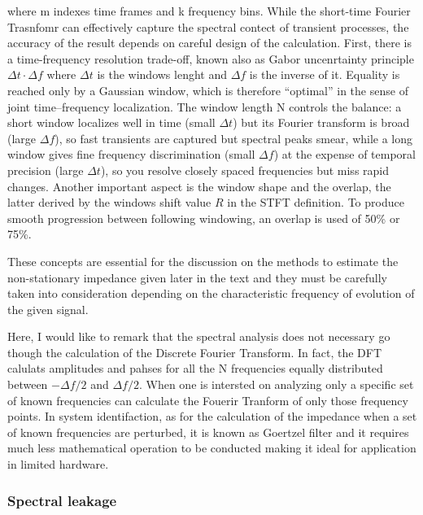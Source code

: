 where m indexes time frames and k frequency bins. While the short-time Fourier Trasnfomr can effectively capture the spectral contect of transient processes, the accuracy of the result depends on careful design of the calculation. First, there is a time-frequency resolution trade-off, known also as Gabor uncenrtainty principle $\Delta t \cdot \Delta f $ where $\Delta t$ is the windows lenght and $\Delta f$ is the inverse of it. Equality is reached only by a Gaussian window, which is therefore “optimal” in the sense of joint time–frequency localization. The window length N controls the balance: a short window localizes well in time (small $\Delta t$) but its Fourier transform is broad (large $\Delta f$), so fast transients are captured but spectral peaks smear, while a long window gives fine frequency discrimination (small $\Delta f$) at the expense of temporal precision (large $\Delta t$), so you resolve closely spaced frequencies but miss rapid changes. Another important aspect is the window shape and the overlap, the latter derived by the windows shift value $R$ in the STFT definition.  To produce smooth progression between following windowing, an overlap is used of 50\% or 75\%. 

These concepts are essential for the discussion on the methods to estimate the non-stationary impedance given later in the text and they must be carefully taken into consideration depending on the characteristic frequency of evolution of the given signal.

Here, I would like to remark that the spectral analysis does not necessary go though the calculation of the Discrete Fourier Transform. In fact, the DFT calulats amplitudes and pahses for all the N frequencies equally distributed between $-\Delta f/2$ and $\Delta f/2$. When one is intersted on analyzing only a specific set of known frequencies can calculate the Fouerir Tranform of only those frequency points. In system identifaction, as for the calculation of the impedance when a set of known frequencies are perturbed, it is known as Goertzel filter and it requires much less mathematical operation to be conducted making it ideal for application in limited hardware.

\subsubsection{Spectral leakage}

